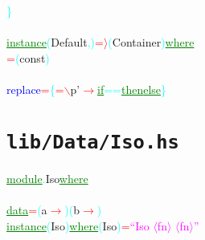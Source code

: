 \textcolor{cyan}{\}}\\\\\textcolor{green}{\underline{instance}}\hsspace \textcolor{cyan}{(}{\rm{}Default}\textcolor{cyan}{,}\textcolor{cyan}{)}\hsspace \textcolor{red}{=\ensuremath{\rangle}}\hsspace \textcolor{cyan}{(}{\rm{}Container}\textcolor{cyan}{)}\hsspace \textcolor{green}{\underline{where}}\\\hsspace \textcolor{red}{=}\hsspace \textcolor{cyan}{(}{\rm{}const}\textcolor{cyan}{)}\\\\\textcolor{blue}{replace}\hsspace \textcolor{red}{=}\hsspace \textcolor{cyan}{\{}\hsspace \textcolor{red}{=}\hsspace \textcolor{red}{$\backslash$}{\rm{}p'}\hsspace \textcolor{red}{\ensuremath{\rightarrow}}\hsspace \textcolor{green}{\underline{if}}\hsspace \textcolor{cyan}{==}\hsspace \textcolor{green}{\underline{then}}\hsspace \textcolor{green}{\underline{else}}\hsspace \textcolor{cyan}{\}}\\
\section{\texttt{lib/Data/Iso.hs}}
\label{mod:Data.Iso}
\textcolor{green}{\underline{module}}\textcolor{cyan}{.}{\rm{}Iso}\hsspace \textcolor{green}{\underline{where}}\\\\\textcolor{green}{\underline{data}}\hsspace \textcolor{red}{=}\hsspace \textcolor{cyan}{(}{\rm{}a}\hsspace \textcolor{red}{\ensuremath{\rightarrow}}\textcolor{cyan}{)}\hsspace \textcolor{cyan}{(}{\rm{}b}\hsspace \textcolor{red}{\ensuremath{\rightarrow}}\textcolor{cyan}{)}\\\textcolor{green}{\underline{instance}}\hsspace \textcolor{cyan}{(}{\rm{}Iso}\textcolor{cyan}{)}\hsspace \textcolor{green}{\underline{where}}\hsspace \textcolor{cyan}{(}{\rm{}Iso}\textcolor{cyan}{)}\hsspace \textcolor{red}{=}\hsspace \textcolor{magenta}{``Iso \ensuremath{\langle}fn\ensuremath{\rangle} \ensuremath{\langle}fn\ensuremath{\rangle}''}\\
